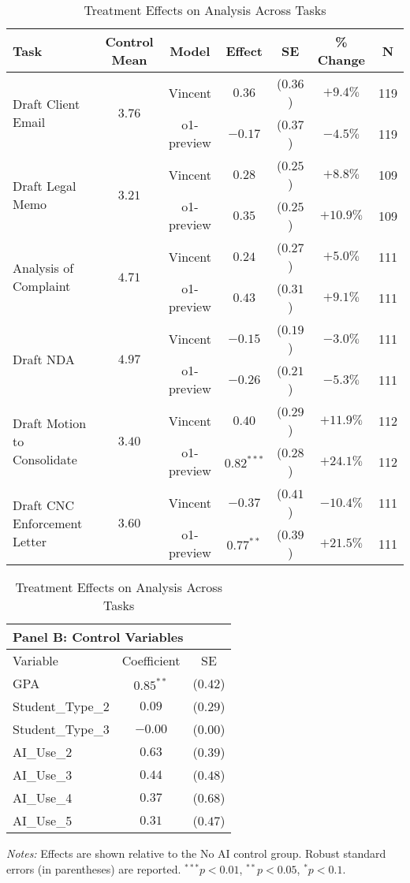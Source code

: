 \begin{table}[!htbp]
\centering
\caption{Treatment Effects on Analysis Across Tasks}
\label{tab:analysis_effects_controls}
\vspace{0.3cm}
\begin{tabular}{lcccccc}
\hline\hline
Task & Control Mean & Model & Effect & SE & \% Change & N \\
\hline
\multirow{2}{*}{Draft Client Email} & \multirow{2}{*}{$3.76$} & Vincent & $0.36$ & ($0.36$) & $+9.4\%$ & 119 \\
& & o1-preview & $-0.17$ & ($0.37$) & $-4.5\%$ & 119 \\
\hline
\multirow{2}{*}{Draft Legal Memo} & \multirow{2}{*}{$3.21$} & Vincent & $0.28$ & ($0.25$) & $+8.8\%$ & 109 \\
& & o1-preview & $0.35$ & ($0.25$) & $+10.9\%$ & 109 \\
\hline
\multirow{2}{*}{Analysis of Complaint} & \multirow{2}{*}{$4.71$} & Vincent & $0.24$ & ($0.27$) & $+5.0\%$ & 111 \\
& & o1-preview & $0.43$ & ($0.31$) & $+9.1\%$ & 111 \\
\hline
\multirow{2}{*}{Draft NDA} & \multirow{2}{*}{$4.97$} & Vincent & $-0.15$ & ($0.19$) & $-3.0\%$ & 111 \\
& & o1-preview & $-0.26$ & ($0.21$) & $-5.3\%$ & 111 \\
\hline
\multirow{2}{*}{Draft Motion to Consolidate} & \multirow{2}{*}{$3.40$} & Vincent & $0.40$ & ($0.29$) & $+11.9\%$ & 112 \\
& & o1-preview & $0.82^{***}$ & ($0.28$) & $+24.1\%$ & 112 \\
\hline
\multirow{2}{*}{Draft CNC Enforcement Letter} & \multirow{2}{*}{$3.60$} & Vincent & $-0.37$ & ($0.41$) & $-10.4\%$ & 111 \\
& & o1-preview & $0.77^{**}$ & ($0.39$) & $+21.5\%$ & 111 \\
\hline
\hline\hline
\end{tabular}

\vspace{0.5cm}

\begin{tabular}{lcc}
\multicolumn{3}{l}{\textbf{Panel B: Control Variables}} \\
\hline\hline
Variable & Coefficient & SE \\
\hline
GPA & $0.85^{**}$ & ($0.42$) \\
Student_Type_2 & $0.09$ & ($0.29$) \\
Student_Type_3 & $-0.00$ & ($0.00$) \\
AI_Use_2 & $0.63$ & ($0.39$) \\
AI_Use_3 & $0.44$ & ($0.48$) \\
AI_Use_4 & $0.37$ & ($0.68$) \\
AI_Use_5 & $0.31$ & ($0.47$) \\
\hline
\end{tabular}
\begin{tablenotes}
\small
\item \textit{Notes:} Effects are shown relative to the No AI control group. Robust standard errors (in parentheses) are reported. $^{***}p<0.01$, $^{**}p<0.05$, $^{*}p<0.1$.
\end{tablenotes}
\end{table}
